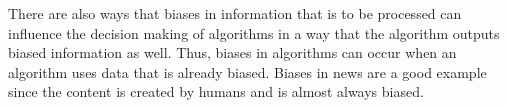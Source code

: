 \documentclass[a4paper]{article}
\begin{document}
There are also ways that biases in information that is to be processed can influence the decision making of algorithms in a way that the algorithm outputs biased information as well.
Thus, biases in algorithms can occur when an algorithm uses data that is already biased.
Biases in news are a good example since the content is created by humans and is almost always biased.




\end{document}
